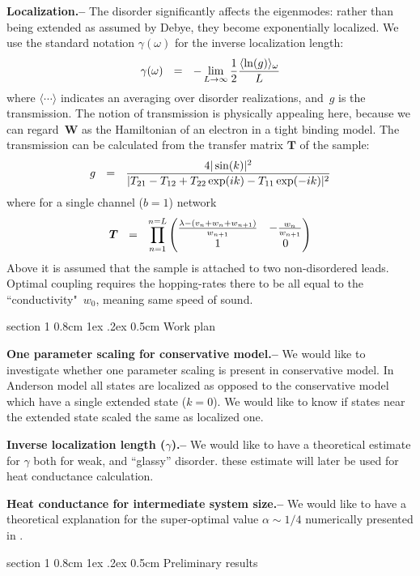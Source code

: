\documentclass[onecolumn,fleqn,notitlepage,secnumarabic]{revtex4}
\makeatletter
\newcommand{\amatrix}[1]{\begin{matrix} #1 \end{matrix}}
\newcommand{\be}[1]{\begin{eqnarray}\ifthenelse{#1=-1}{\nonumber}{\ifthenelse{#1=0}{}{\label{e#1}}}}
\newcommand{\ee}{\end{eqnarray}}
\newcommand{\beq}{\be{1}}
\newcommand{\eeq}{\ee}
\newcommand{\sect}[1]{{\bf #1.-- }}
\def\section{%
  \@startsection
    {section}%
    {1}%
    {\z@}%
    {0.8cm \@plus1ex \@minus .2ex}%
    {0.5cm}%
    {\Large\bf }%
}%
\makeatother
\begin{document}
\sect{Localization}
%
The disorder significantly affects the eigenmodes: rather than being extended 
as assumed by Debye, they become exponentially localized. 
We use the standard notation $\gamma(\omega)$ for the inverse localization length: 
%
\beq
\label{locdef}
\gamma(\omega) \ \ = \ \ -\lim_{L\rightarrow \infty}{1\over 2}{\langle \ln(g) \rangle_{\omega} \over L}
\eeq
%
where $\langle\cdots\rangle$ indicates an averaging over disorder realizations, 
and~$g$ is the transmission. The notion of transmission is physically appealing here,  
because we can regard~$\bm{W}$ as the Hamiltonian of an electron in a tight binding model. 
The transmission can be calculated from the transfer matrix $\bm{T}$ of the sample:
%
\beq
\label{gTMM}
g \ \ = \ \ \frac{4|\sin(k)|^2}{|T_{21}-T_{12}+T_{22}\exp(ik)-T_{11}\exp(-ik)|^2}
\eeq
%
where for a single channel ($b=1$) network
%
\be{5}
\bm{T} \ \ = \ \ \prod_{n=1}^{n=L} 
\left(\amatrix{
\frac{\lambda-(v_n + w_{n}+w_{n+1})}{w_{n+1}} & -\frac{w_{n}}{w_{n+1}} \cr 1 & 0 
}\right)
\eeq
%
Above it is assumed that the sample is attached to two non-disordered leads.
Optimal coupling requires the hopping-rates there to be all equal 
to the ``conductivity"~$w_0$, meaning same speed of sound. 



\section{Work plan}

{ \bf One parameter scaling for conservative model.-- } We would like to investigate whether one parameter scaling is present in conservative model. In Anderson model all states are localized as opposed to the conservative model which have a single extended state ($k=0$). We would like to know if states near the extended state scaled the same as localized one.

{ \bf Inverse localization length ($\gamma$).-- } We would like to have a theoretical estimate for $\gamma$ both for weak, and ``glassy'' disorder. these estimate will later be used for heat conductance calculation.

{ \bf Heat conductance for intermediate system size.-- } We would like to have a theoretical explanation for the super-optimal value $\alpha \sim 1/4$ numerically presented in \cite{BZFK13}.


\section{Preliminary results} \label{sec:prelim}
\end{document}
